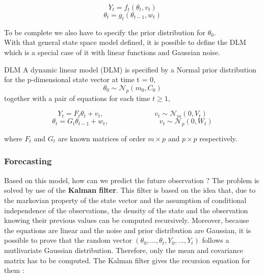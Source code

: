 \documentclass{article}
\begin{document}
$$Y_t = f_t(\theta_t, v_t)$$
$$\theta_t = g_t(\theta_{t-1}, w_t)$$

To be complete we also have to specify the prior distribution for $\theta_0$. \\

With that general state space model defined, it is possible to define the DLM which is a special case of it with linear functions and Gaussian noise. \\

\theoremstyle{definition}
\begin{definition}{DLM}
A dynamic linear model (DLM) is specified by a Normal prior distribution for the p-dimensional state vector at time t = 0,
$$\theta_0 \sim \mathcal{N}_p(m_0, C_0)$$
together with a pair of equations for each time $t \ge 1$,

$$Y_t = F_t\theta_t + v_t, \hspace{3cm} v_t \sim \mathcal{N}_m(0, V_t)$$
$$\theta_t = G_t\theta_{t-1} + w_t, \hspace{3cm} v_t \sim \mathcal{N}_p(0, W_t)$$

where $F_t$ and $G_t$ are known matrices of order $m \times p$ and $p \times p$ respectively.
\end{definition}

\subsubsection*{Forecasting}

Based on this model, how can we predict the future observation ? The problem is solved by use of the \textbf{Kalman filter}. This filter is based on the idea that, due to the markovian property of the state vector and the assumption of conditional independence of the observations, the density of the state and the observation knowing their previous values can be computed recursively. Moreover, because the equations are linear and the noise and prior distribution are Gaussian, it is possible to prove that the random vector $(\theta_0, ..., \theta_t, Y_0, ..., Y_t)$ follows a mutlivariate Gaussian distribution. Therefore, only the mean and covariance matrix has to be computed. The Kalman filter gives the recursion equation for them : \\
\end{document}
